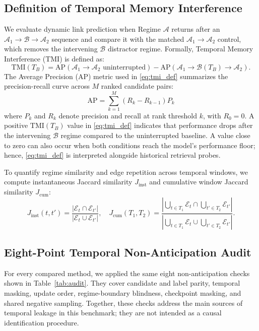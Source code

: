 \documentclass[conference]{IEEEtran}
\begin{document}
\subsection{Definition of Temporal Memory Interference}
We evaluate dynamic link prediction when Regime $\mathcal{A}$ returns after an $\mathcal{A}_1 \to \mathcal{B} \to \mathcal{A}_2$ sequence and compare it with the matched $\mathcal{A}_1 \to \mathcal{A}_2$ control, which removes the intervening $\mathcal{B}$ distractor regime. Formally, Temporal Memory Interference ($\text{TMI}$) is defined as:
\begin{equation}
\label{eq:tmi_def}
\text{TMI}(T_B) = \text{AP}(\mathcal{A}_1 \to \mathcal{A}_2 \text{ uninterrupted}) - \text{AP}(\mathcal{A}_1 \to \mathcal{B}(T_B) \to \mathcal{A}_2).
\end{equation}
The Average Precision ($\text{AP}$) metric used in \eqref{eq:tmi_def} summarizes the precision-recall curve across $M$ ranked candidate pairs:
\begin{equation}
\label{eq:ap_metric}
\text{AP} = \sum_{k=1}^M \left( R_k - R_{k-1} \right) P_k
\end{equation}
where $P_k$ and $R_k$ denote precision and recall at rank threshold $k$, with $R_0 = 0$. A positive $\text{TMI}(T_B)$ value in \eqref{eq:tmi_def} indicates that performance drops after the intervening $\mathcal{B}$ regime compared to the uninterrupted baseline. A value close to zero can also occur when both conditions reach the model's performance floor; hence, \eqref{eq:tmi_def} is interpreted alongside historical retrieval probes.

To quantify regime similarity and edge repetition across temporal windows, we compute instantaneous Jaccard similarity $J_{\text{inst}}$ and cumulative window Jaccard similarity $J_{\text{cum}}$:
\begin{equation}
\label{eq:jaccard_overlap}
J_{\text{inst}}(t, t') = \frac{|\mathcal{E}_t \cap \mathcal{E}_{t'}|}{|\mathcal{E}_t \cup \mathcal{E}_{t'}|}, \quad J_{\text{cum}}(T_1, T_2) = \frac{\left|\bigcup_{t \in T_1} \mathcal{E}_t \cap \bigcup_{t' \in T_2} \mathcal{E}_{t'}\right|}{\left|\bigcup_{t \in T_1} \mathcal{E}_t \cup \bigcup_{t' \in T_2} \mathcal{E}_{t'}\right|}.
\end{equation}

\subsection{Eight-Point Temporal Non-Anticipation Audit}
For every compared method, we applied the same eight non-anticipation checks shown in Table~\ref{tab:audit}. They cover candidate and label parity, temporal masking, update order, regime-boundary blindness, checkpoint masking, and shared negative sampling. Together, these checks address the main sources of temporal leakage in this benchmark; they are not intended as a causal identification procedure.
\end{document}
